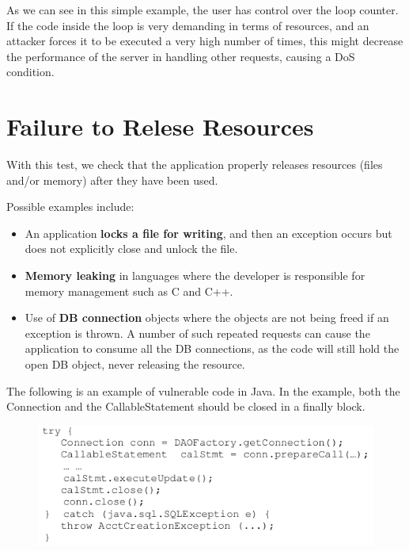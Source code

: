 		As we can see in this simple example, the user has control over the loop counter. If the code 
		inside the loop is very demanding in terms of resources, and an attacker forces it to be executed 
		a very high number of times, this might decrease the performance of the server in handling other
		requests, causing a DoS condition.

	\section{Failure to Relese Resources}
		With this test, we check that the application properly releases resources (files and/or memory) 
		after they have been used.

		Possible examples include:
			\begin{itemize}
				\item An application {\bf locks a file for writing}, and then an exception occurs but does 
				not explicitly close and unlock the file.
				\item {\bf Memory leaking} in languages where the developer is responsible for memory 
				management such as C and C++. 
				\item Use of {\bf DB connection} objects where the objects are not being freed if 
				an exception is thrown. A number of such repeated requests can cause the application 
				to consume all the DB connections, as the code will still hold the open DB object, 
				never releasing the resource.
			\end{itemize}

		The following is an example of vulnerable code in Java. In the example, both the Connection and 
		the CallableStatement should be closed in a finally block.

		\begin{figure}[H]
			\includegraphics[width=\textwidth]{pics/DBConnection.png}
		\end{figure}

		






